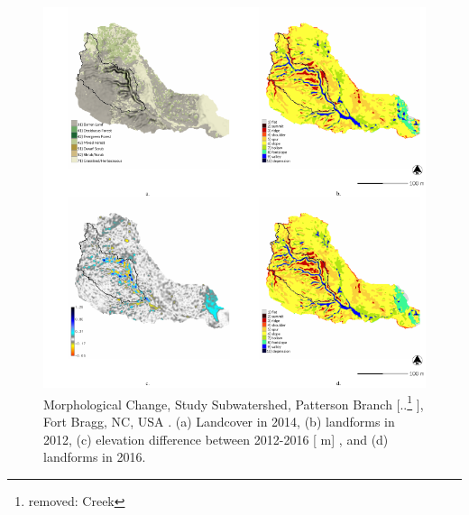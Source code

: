 \documentclass[gmd, manuscript]{copernicus}
\providecommand{\DIFadd}[1]{{\protect\color{blue} \sf #1}} %
\providecommand{\DIFdel}[1]{{\protect\color{red} [..\footnote{removed: #1} ]}} %
\providecommand{\DIFaddFL}[1]{\DIFadd{#1}} %
\providecommand{\DIFdelFL}[1]{\DIFdel{#1}} %
\providecommand{\DIFaddbeginFL}{} %
\providecommand{\DIFaddendFL}{} %
\providecommand{\DIFdelbeginFL}{} %
\providecommand{\DIFdelendFL}{} %
\begin{document}
\begin{figure}
\center
\includegraphics[width=\textwidth,height=0.95\textheight,keepaspectratio]{figures/study_area.pdf}
\caption{\DIFaddbeginFL \DIFaddFL{Morphological Change, Study }\DIFaddendFL Subwatershed, Patterson Branch\DIFdelbeginFL \DIFdelFL{Creek}\DIFdelendFL , Fort Bragg, NC, USA\DIFaddbeginFL \DIFaddFL{.
(a) Landcover in 2014, 
(b) landforms in 2012,
(c) elevation difference between 2012-2016 }[\DIFaddFL{m}]\DIFaddFL{, and
(d) landforms in 2016.
}\DIFaddendFL }
\label{fig:study_area}
\end{figure}
\end{document}
